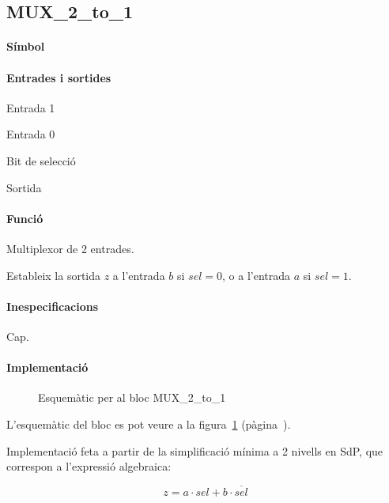 \subsection{\label{sub:\projectname-MUX_2_to_1} \textsf{MUX\_2\_to\_1}}

\paragraph{Símbol}
\begin{center}  \end{center}

\paragraph{Entrades i sortides}

\begin{where}
\item[\nodenamebit{a}] Entrada 1
\item[\nodenamebit{b}] Entrada 0
\item[\nodenamebit{sel}] Bit de selecció
\item[\nodenamebit{z}] Sortida
\end{where}

\paragraph{Funció}

Multiplexor de 2 entrades.

Estableix la sortida $z$ a l'entrada $b$ si $sel = 0$,
o a l'entrada $a$ si $sel = 1$.

\paragraph{Inespecificacions}

Cap.

\paragraph{Implementació}

\begin{figure}[b]
  \begin{center}
  \end{center}
  \caption{\label{fig:\projectname-MUX_2_to_1} Esquemàtic per al bloc \textsf{MUX\_2\_to\_1}}
\end{figure}

L'esquemàtic del bloc es pot veure a la figura~\ref{fig:\projectname-MUX_2_to_1} (pàgina~\pageref{fig:\projectname-MUX_2_to_1}).

Implementació feta a partir de la simplificació mínima a 2 nivells en SdP,
que correspon a l'expressió algebraica:

\begin{equation*}
  z = a \cdot sel + b \cdot \overline{sel}
\end{equation*}

\vspace{1cm}
